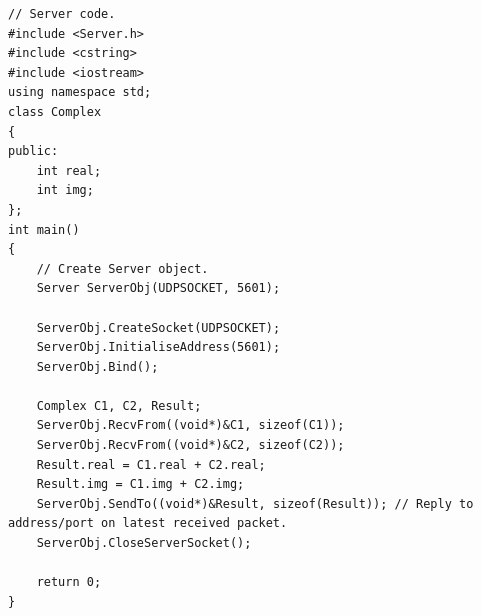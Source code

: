 \documentclass[12pt,a4paper]{article}
\begin{document}
\begin{lstlisting}
// Server code.
#include <Server.h>
#include <cstring>
#include <iostream>
using namespace std;
class Complex
{
public:
	int real;
	int img;
};
int main()
{
	// Create Server object.
	Server ServerObj(UDPSOCKET, 5601);

	ServerObj.CreateSocket(UDPSOCKET);
	ServerObj.InitialiseAddress(5601);
	ServerObj.Bind();

	Complex C1, C2, Result;
	ServerObj.RecvFrom((void*)&C1, sizeof(C1));
	ServerObj.RecvFrom((void*)&C2, sizeof(C2));
	Result.real = C1.real + C2.real;
	Result.img = C1.img + C2.img;
	ServerObj.SendTo((void*)&Result, sizeof(Result)); // Reply to address/port on latest received packet.
	ServerObj.CloseServerSocket();

	return 0;
}
\end{lstlisting}
\end{document}
